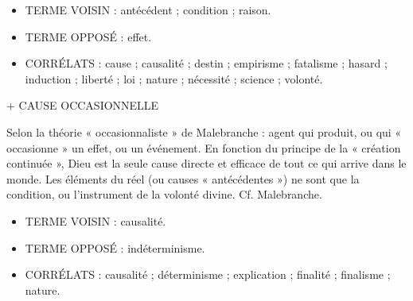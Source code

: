 \begin{itemize}[leftmargin=1cm, label=, itemsep=1pt]
\item {\footnotesize TERME VOISIN} : antécédent ;
condition ; raison.
\item {\footnotesize TERME OPPOSÉ} : effet.
\end{itemize}


\begin{itemize}[leftmargin=1cm, label=, itemsep=1pt]
\item {\footnotesize CORRÉLATS} : cause ; causalité ; destin ;  empirisme ;  fatalisme ; hasard ; induction ; liberté ; loi ; nature ; nécessité ; science ; volonté.
\end{itemize}

+ CAUSE OCCASIONNELLE

Selon la théorie « occasionnaliste » de
Malebranche : agent qui produit, ou qui
« occasionne » un effet, ou un événement.
En fonction du principe de la
« création continuée », Dieu est la seule
cause directe et efficace de tout ce qui
arrive dans le monde. Les éléments du
réel (ou causes « antécédentes ») ne sont
que la condition, ou l'instrument de la
volonté divine. Cf. Malebranche.

\begin{itemize}[leftmargin=1cm, label=, itemsep=1pt]
\item {\footnotesize TERME VOISIN} : causalité.
\item {\footnotesize TERME OPPOSÉ} : indéterminisme.
\end{itemize}


\begin{itemize}[leftmargin=1cm, label=, itemsep=1pt]
\item {\footnotesize CORRÉLATS} : causalité ; déterminisme ;
explication ; finalité ; finalisme ; nature.
\end{itemize}

